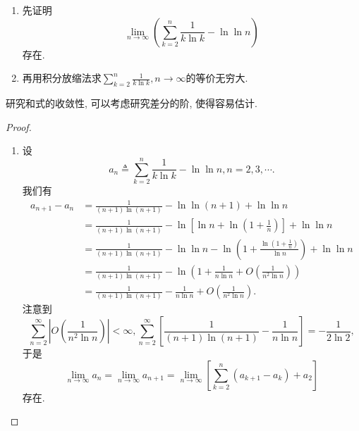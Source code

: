 \documentclass[../../main.tex]{subfiles}
\begin{document}
\begin{example}\label{example:例题8.5021514}
\begin{enumerate}
\item 先证明
\[
\lim_{n \to \infty} \left( \sum_{k=2}^n \frac{1}{k \ln k} - \ln \ln n \right)
\]
存在.

\item 再用积分放缩法求\(\sum_{k = 2}^{n}\frac{1}{k\ln k},n\to\infty\)的等价无穷大.
\end{enumerate}
\end{example}
\begin{note}
研究和式的收敛性, 可以考虑研究差分的阶, 使得容易估计.
\end{note}
\begin{proof}
\begin{enumerate}
\item 设
\[
a_n \triangleq \sum_{k=2}^n \frac{1}{k \ln k} - \ln \ln n, n = 2, 3, \cdots.
\]
我们有
\[
\begin{aligned}
a_{n + 1} - a_n &= \frac{1}{(n + 1) \ln (n + 1)} - \ln \ln (n + 1) + \ln \ln n \\
&= \frac{1}{(n + 1) \ln (n + 1)} - \ln \left[ \ln n + \ln \left( 1 + \frac{1}{n} \right) \right] + \ln \ln n \\
&= \frac{1}{(n + 1) \ln (n + 1)} - \ln \ln n - \ln \left( 1 + \frac{\ln \left( 1 + \frac{1}{n} \right)}{\ln n} \right) + \ln \ln n \\
&= \frac{1}{(n + 1) \ln (n + 1)} - \ln \left( 1 + \frac{1}{n \ln n} + O \left( \frac{1}{n^2 \ln n} \right) \right) \\
&= \frac{1}{(n + 1) \ln (n + 1)} - \frac{1}{n \ln n} + O \left( \frac{1}{n^2 \ln n} \right).
\end{aligned}
\]
注意到
\[
\sum_{n=2}^\infty \left| O \left( \frac{1}{n^2 \ln n} \right) \right| < \infty, \sum_{n=2}^\infty \left[ \frac{1}{(n + 1) \ln (n + 1)} - \frac{1}{n \ln n} \right] = -\frac{1}{2 \ln 2},
\]
于是
\[
\lim_{n \to \infty} a_n = \lim_{n \to \infty} a_{n + 1} = \lim_{n \to \infty} \left[ \sum_{k=2}^n (a_{k + 1} - a_k) + a_2 \right]
\]
存在.


\end{enumerate}
\end{proof}
\end{document}
